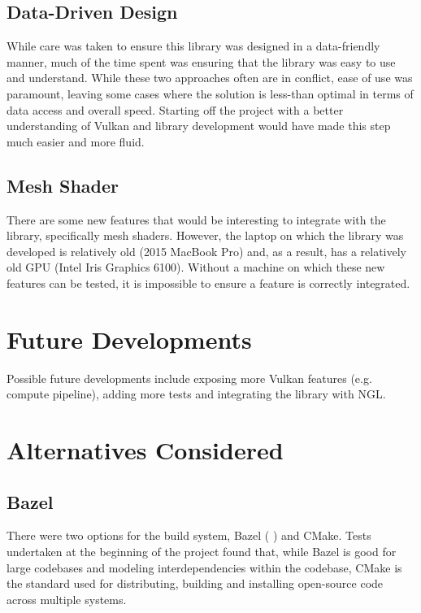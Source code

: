 \documentclass[12pt]{report}
\newcommand{\citebu}[1]{(\citenoparen{#1})}
\newcommand{\citenoparen}[1]{\citeauthor{#1} \citeyear{#1}}
\theoremstyle{definition}
\begin{document}
    \subsection{Data-Driven Design}

      While care was taken to ensure this library was designed in a data-friendly
      manner, much of the time spent was ensuring that the library was easy to
      use and understand. While these two approaches often are in conflict, ease of
      use was paramount, leaving some cases where the solution is less-than
      optimal in terms of data access and overall speed. Starting off the
      project with a better understanding of Vulkan and library development
      would have made this step much easier and more fluid.

    \subsection{Mesh Shader}

      There are some new features that would be interesting to integrate with
      the library, specifically mesh shaders. However, the laptop on which
      the library was developed is relatively old (2015 MacBook Pro) and,
      as a result, has a relatively old GPU (Intel Iris Graphics 6100).
      Without a machine on which these new features can be tested, it
      is impossible to ensure a feature is correctly integrated.

  \section{Future Developments}
    
    Possible future developments include exposing more Vulkan features
    (e.g. compute pipeline), adding more tests and integrating the library with
    NGL.

  \section{Alternatives Considered}

    \subsection{Bazel}

      There were two options for the build system, Bazel \citebu{bazel} and CMake.
      Tests undertaken at the beginning of the
      project found that, while Bazel is good for large codebases and
      modeling interdependencies within the codebase, CMake is the
      standard used for distributing, building and installing
      open-source code across multiple systems.
\end{document}
